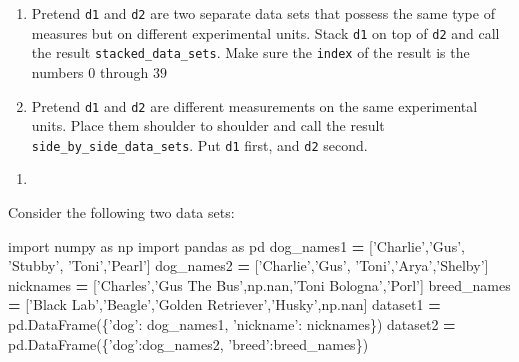 \documentclass[12pt,krantz2]{krantz}
\makeatletter
\newenvironment{Shaded}{\begin{snugshade}}{\end{snugshade}}
\newcommand{\ImportTok}[1]{#1}
\newcommand{\NormalTok}[1]{#1}
\newcommand{\OperatorTok}[1]{\textcolor[rgb]{0.43,0.43,0.43}{\textbf{#1}}}
\newcommand{\StringTok}[1]{\textcolor[rgb]{0.5,0.5,0.5}{#1}}
\providecommand{\tightlist}{%
  \setlength{\itemsep}{0pt}\setlength{\parskip}{0pt}}
\newenvironment{kframe}{%
\medskip{}
\setlength{\fboxsep}{.8em}
 \def\at@end@of@kframe{}%
 \ifinner\ifhmode%
  \def\at@end@of@kframe{\end{minipage}}%
  \begin{minipage}{\columnwidth}%
 \fi\fi%
 \def\FrameCommand##1{\hskip\@totalleftmargin \hskip-\fboxsep
 \colorbox{shadecolor}{##1}\hskip-\fboxsep
     \hskip-\linewidth \hskip-\@totalleftmargin \hskip\columnwidth}%
 \MakeFramed {\advance\hsize-\width
   \@totalleftmargin\z@ \linewidth\hsize
   \@setminipage}}%
 {\par\unskip\endMakeFramed%
 \at@end@of@kframe}
\renewenvironment{Shaded}{\begin{kframe}}{\end{kframe}}
\makeatother
\begin{document}
\begin{enumerate}
\def\labelenumi{\alph{enumi})}
\tightlist
\item
  Pretend \texttt{d1} and \texttt{d2} are two separate data sets that possess the same type of measures but on different experimental units. Stack \texttt{d1} on top of \texttt{d2} and call the result \texttt{stacked\_data\_sets}. Make sure the \texttt{index} of the result is the numbers \(0\) through \(39\)
\item
  Pretend \texttt{d1} and \texttt{d2} are different measurements on the same experimental units. Place them shoulder to shoulder and call the result \texttt{side\_by\_side\_data\_sets}. Put \texttt{d1} first, and \texttt{d2} second.
\end{enumerate}

\begin{enumerate}
\def\labelenumi{\arabic{enumi}.}
\setcounter{enumi}{2}
\item
\end{enumerate}

Consider the following two data sets:

\begin{Shaded}
\begin{Highlighting}[]
\ImportTok{import}\NormalTok{ numpy }\ImportTok{as}\NormalTok{ np}
\ImportTok{import}\NormalTok{ pandas }\ImportTok{as}\NormalTok{ pd}
\NormalTok{dog_names1 }\OperatorTok{=}\NormalTok{ [}\StringTok{'Charlie'}\NormalTok{,}\StringTok{'Gus'}\NormalTok{, }\StringTok{'Stubby'}\NormalTok{, }\StringTok{'Toni'}\NormalTok{,}\StringTok{'Pearl'}\NormalTok{]}
\NormalTok{dog_names2 }\OperatorTok{=}\NormalTok{ [}\StringTok{'Charlie'}\NormalTok{,}\StringTok{'Gus'}\NormalTok{, }\StringTok{'Toni'}\NormalTok{,}\StringTok{'Arya'}\NormalTok{,}\StringTok{'Shelby'}\NormalTok{]}
\NormalTok{nicknames }\OperatorTok{=}\NormalTok{ [}\StringTok{'Charles'}\NormalTok{,}\StringTok{'Gus The Bus'}\NormalTok{,np.nan,}\StringTok{'Toni Bologna'}\NormalTok{,}\StringTok{'Porl'}\NormalTok{]}
\NormalTok{breed_names }\OperatorTok{=}\NormalTok{ [}\StringTok{'Black Lab'}\NormalTok{,}\StringTok{'Beagle'}\NormalTok{,}\StringTok{'Golden Retriever'}\NormalTok{,}\StringTok{'Husky'}\NormalTok{,np.nan]}
\NormalTok{dataset1 }\OperatorTok{=}\NormalTok{ pd.DataFrame(\{}\StringTok{'dog'}\NormalTok{: dog_names1,}
                        \StringTok{'nickname'}\NormalTok{: nicknames\})}
\NormalTok{dataset2 }\OperatorTok{=}\NormalTok{ pd.DataFrame(\{}\StringTok{'dog'}\NormalTok{:dog_names2,}
                        \StringTok{'breed'}\NormalTok{:breed_names\})}
\end{Highlighting}
\end{Shaded}
\end{document}
